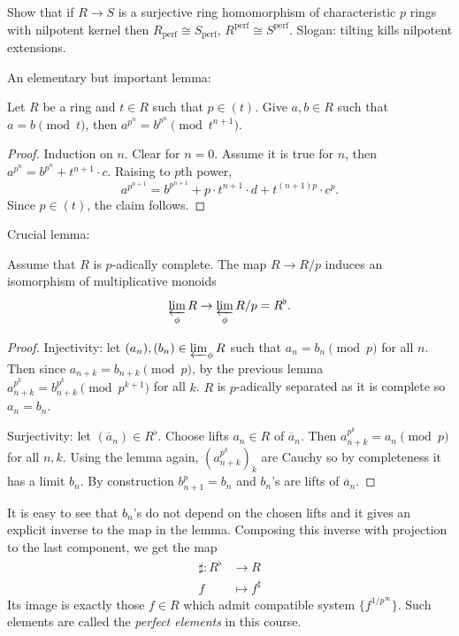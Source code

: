 \documentclass[a4paper]{article}
\newcommand{\tilt}{\flat} %
\newcommand{\perf}{\mathrm{perf}}
\begin{document}
\begin{ex}
  Show that if \(R \to S\) is a surjective ring homomorphism of characteristic \(p\) rings with nilpotent kernel then \(R_\perf \cong S_\perf\), \(R^\perf \cong S^\perf\). Slogan: tilting kills nilpotent extensions.
\end{ex}

An elementary but important lemma:

\begin{lemma}
  Let \(R\) be a ring and \(t \in R\) such that \(p \in (t)\). Give \(a, b \in R\) such that \(a = b \pmod t\), then \(a^{p^n} = b^{p^n} \pmod{t^{n + 1}}\).
\end{lemma}

\begin{proof}
  Induction on \(n\). Clear for \(n = 0\). Assume it is true for \(n\), then \(a^{p^n} = b^{p^n} + t^{n + 1} \cdot c\). Raising to \(p\)th power,
  \[
    a^{p^{n + 1}} = b^{p^{n + 1}} + p \cdot t^{n + 1} \cdot d + t^{(n + 1) p} \cdot c^p.
  \]
  Since \(p \in (t)\), the claim follows.
\end{proof}

Crucial lemma:

\begin{lemma}
  Assume that \(R\) is \(p\)-adically complete. The map \(R \to R/p\) induces an isomorphism of multiplicative monoids
  \[
    \varprojlim_\phi R \to \varprojlim_\phi R/p = R^\tilt.
  \]
\end{lemma}

\begin{proof}
  Injectivity: let \((a_n), (b_n) \in \varprojlim_\phi R\) such that \(a_n = b_n \pmod p\) for all \(n\). Then since \(a_{n + k} = b_{n + k} \pmod p\), by the previous lemma \(a_{n + k}^{p^k} = b_{n + k}^{p^k} \pmod{p^{k + 1}}\) for all \(k\). \(R\) is \(p\)-adically separated as it is complete so \(a_n = b_n\).

  Surjectivity: let \((\overline a_n) \in R^\tilt\). Choose lifts \(a_n \in R\) of \(\overline a_n\). Then \(a_{n + k}^{p^k} = a_n \pmod p\) for all \(n, k\). Using the lemma again, \((a_{n + k}^{p^k})_k\) are Cauchy so by completeness it has a limit \(b_n\). By construction \(b_{n + 1}^p = b_n\) and \(b_n\)'s are lifts of \(\overline a_n\).
\end{proof}

\begin{remark}
  It is easy to see that \(b_n\)'s do not depend on the chosen lifts and it gives an explicit inverse to the map in the lemma. Composing this inverse with projection to the last component, we get the map
  \begin{align*}
    \sharp: R^\tilt &\to R \\
    f &\mapsto f^\sharp
  \end{align*}
  Its image is exactly those \(f \in R\) which admit compatible system \(\{f^{1/p^\infty}\}\). Such elements are called the \emph{perfect elements} in this course.
\end{remark}
\end{document}
